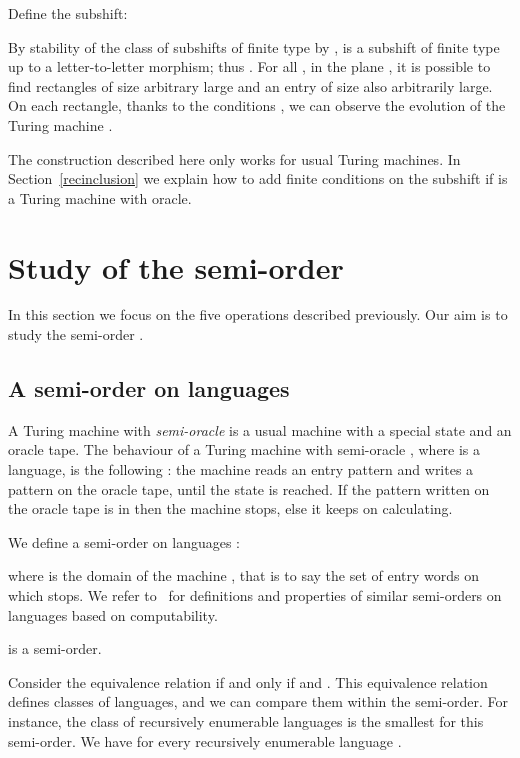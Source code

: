 \documentclass[proceedings]{stacs}
\theoremstyle{plain}\newtheorem{satz}[thm]{Satz}
\theoremstyle{definition}\newtheorem{crucial}[thm]{Crucial Definition}
\begin{document}
Define  the subshift:


By stability of the class of subshifts of finite type by ,  is a subshift of finite type up to a letter-to-letter morphism; thus . For all , in the plane , it is possible to find rectangles of size  arbitrary large and an entry of size  also arbitrarily large. On each rectangle, thanks to the conditions , we can observe the evolution of the Turing machine .

\begin{remark}
The construction described here only works for usual Turing machines. In Section~\ref{recinclusion} we explain how to add finite conditions on the subshift  if  is a Turing machine with oracle. 
\end{remark}

\section{Study of the semi-order }\label{MainResult}

In this section we focus on the five operations described previously. Our aim is to study the semi-order .

	\subsection{A semi-order on languages}

A Turing machine with \emph{semi-oracle} is a usual machine with a special state  and an oracle tape. The behaviour of a Turing machine with semi-oracle , where  is a language, is the following : the machine reads an entry pattern  and writes a pattern on the oracle tape, until the state  is reached. If the pattern written on the oracle tape is in  then the machine stops, else it keeps on calculating.

We define a semi-order on languages :

where  is the domain of the machine , that is to say the set of entry words on which  stops. We refer to~\cite{rogersjr1987trf} for definitions and properties of similar semi-orders on languages based on computability.

\begin{prop}\label{semi-order}
 is a semi-order.
\end{prop}

Consider the equivalence relation  if and only if  and . This equivalence relation defines classes of languages, and we can compare them within the semi-order. For instance, the class of recursively enumerable languages is the smallest for this semi-order. We have  for every recursively enumerable language .
\end{document}

